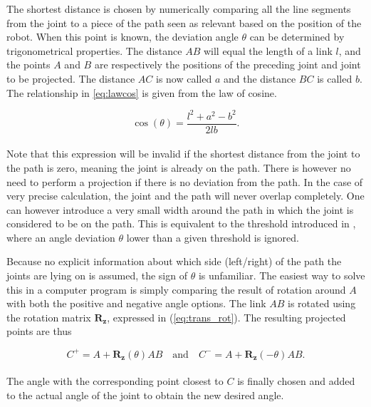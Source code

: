 The shortest distance is chosen by numerically comparing all the line segments from the joint to a piece of the path seen as relevant based on the position of the robot. When this point is known, the deviation angle $\theta$ can be determined by trigonometrical properties. The distance $AB$ will equal the length of a link $l$, and the points $A$ and $B$ are respectively the positions of the preceding joint and joint to be projected. The distance $AC$ is now called $a$ and the distance $BC$ is called $b$. The relationship in \ref{eq:lawcos} is given from the law of cosine.

\begin{equation}\label{eq:lawcos}
    \cos{(\theta)} = \frac{l^2 + a^2 - b^2}{2lb}.
\end{equation}
\\
Note that this expression will be invalid if the shortest distance from the joint to the path is zero, meaning the joint is already on the path. There is however no need to perform a projection if there is no deviation from the path. In the case of very precise calculation, the joint and the path will never overlap completely. One can however introduce a very small width around the path in which the joint is considered to be on the path. This is equivalent to the threshold introduced in \cite{conkur2008path}, where an angle deviation $\theta$ lower than a given threshold is ignored.

Because no explicit information about which side (left/right) of the path the joints are lying on is assumed, the sign of $\theta$ is unfamiliar. The easiest way to solve this in a computer program is simply comparing the result of rotation around $A$ with both the positive and negative angle options. The link $AB$ is rotated using the rotation matrix $\mathbf{R_z}$, expressed in (\ref{eq:trans_rot}). The resulting projected points are thus

\begin{equation}
    C^+ = A + \mathbf{R_z}(\theta)AB \quad \text{and} \quad
    C^- = A + \mathbf{R_z}(-\theta)AB.
\end{equation}
\\
The angle with the corresponding point closest to $C$ is finally chosen and added to the actual angle of the joint to obtain the new desired angle.



